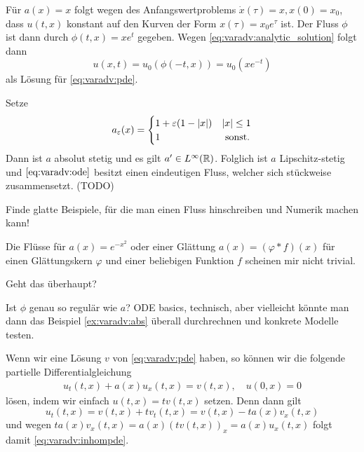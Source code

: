 \begin{example}
Für $a(x) = x$ folgt wegen des Anfangswertproblems $\dot x(\tau) = x, x(0) = x_0$, dass $u(t,x)$ konstant auf den Kurven der Form $x(\tau) = x_0 e^{\tau}$ ist.
Der Fluss $\phi$ ist dann durch $\phi(t,x) = x e^t$ gegeben. Wegen \eqref{eq:varadv:analytic_solution} folgt dann \[ u(x,t) = u_0(\phi(-t,x)) = u_0(x e^{-t}) \] als Lösung für \eqref{eq:varadv:pde}.
\end{example}
\begin{example} \label{ex:varadv:abs}
Setze
\[
a_\varepsilon(x) = \begin{cases} 
    1 + \varepsilon (1 - \left| x \right|) & \left| x \right| \leq 1\\
    1 & \text{ sonst.}
\end{cases}
\]
Dann ist $a$ absolut stetig und es gilt $a' \in L^\infty(\mathbb R)$.
Folglich ist $a$ Lipschitz-stetig und $\eqref{eq:varadv:ode}$ besitzt einen eindeutigen Fluss, welcher sich stückweise zusammensetzt. (TODO)
\end{example}

\begin{remark}Finde glatte Beispiele, für die man einen Fluss hinschreiben und Numerik machen kann!\end{remark}

\begin{remark}Die Flüsse für $a(x) = e^{-x^2}$ oder einer Glättung $a(x) = (\varphi * f)(x)$ für einen Glättungskern $\varphi$ und einer beliebigen Funktion $f$ scheinen mir nicht trivial.\end{remark}

\begin{frage}Geht das überhaupt?\end{frage}

\begin{frage}Ist $\phi$ genau so regulär wie $a$? ODE basics, technisch, aber vielleicht könnte man dann das Beispiel \ref{ex:varadv:abs} überall durchrechnen und konkrete Modelle testen.\end{frage}

Wenn wir eine Lösung $v$ von \eqref{eq:varadv:pde} haben, so können wir die folgende partielle Differentialgleichung
\begin{align}\label{eq:varadv:inhompde}
u_t(t,x) + a(x) u_x(t,x) = v(t,x), \quad u(0,x) = 0
\end{align}
lösen, indem wir einfach $u(t,x) = t v(t,x)$ setzen. Denn dann gilt
\[ u_t(t,x) = v(t,x) + t v_t(t,x) = v(t,x) - t a(x) v_x(t,x) \]
und wegen $t a(x) v_x(t,x) = a(x) (t v(t,x))_x = a(x) u_x(t,x)$ folgt damit \eqref{eq:varadv:inhompde}.

